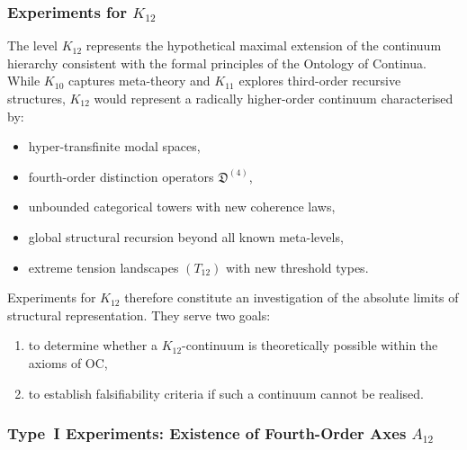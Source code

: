 
\subsubsection{Experiments for $K_{12}$}
\label{sec:experiments-k12}

The level $K_{12}$ represents the hypothetical maximal extension of 
the continuum hierarchy consistent with the formal principles of the 
Ontology of Continua.  
While $K_{10}$ captures meta-theory and $K_{11}$ explores 
third-order recursive structures, $K_{12}$ would represent a 
radically higher-order continuum characterised by:

\begin{itemize}
    \item hyper-transfinite modal spaces,
    \item fourth-order distinction operators $\mathfrak{D}^{(4)}$,
    \item unbounded categorical towers with new coherence laws,
    \item global structural recursion beyond all known meta-levels,
    \item extreme tension landscapes $(T_{12})$ with new threshold types.
\end{itemize}

Experiments for $K_{12}$ therefore constitute an investigation of the 
absolute limits of structural representation.  
They serve two goals:

\begin{enumerate}
    \item to determine whether a $K_{12}$-continuum is theoretically 
          possible within the axioms of OC,
    \item to establish falsifiability criteria if such a continuum 
          cannot be realised.
\end{enumerate}



\subsubsection{Type~I Experiments: Existence of Fourth-Order Axes $A_{12}$}

